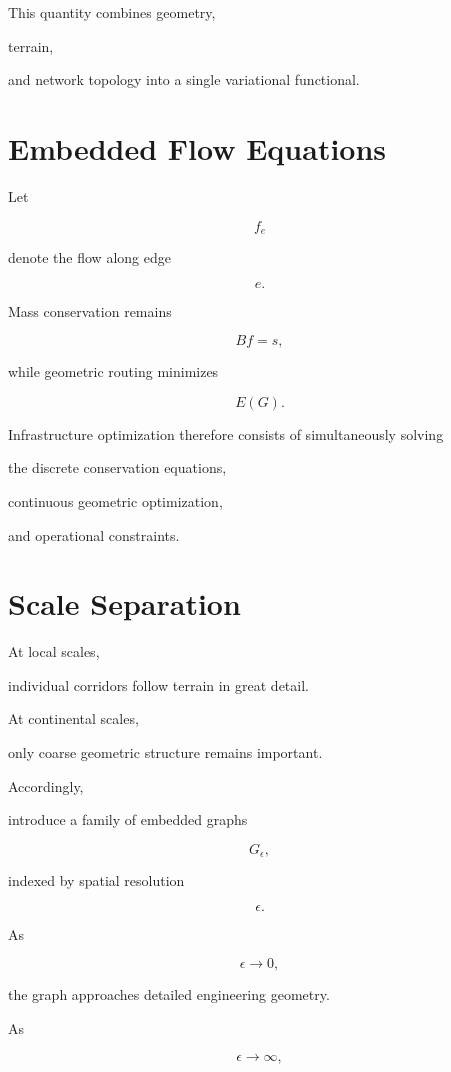 \documentclass[11pt,fleqn]{book}
\numberwithin{equation}{chapter}
\theoremstyle{plain}
\theoremstyle{definition}
\theoremstyle{remark}
\begin{document}
This quantity combines geometry,

terrain,

and network topology into a single variational functional.


\section{Embedded Flow Equations}

Let

\[
f_e
\]

denote the flow along edge

\[
e.
\]

Mass conservation remains

\[
Bf=s,
\]

while geometric routing minimizes

\[
E(G).
\]

Infrastructure optimization therefore consists of simultaneously solving

the discrete conservation equations,

continuous geometric optimization,

and operational constraints.


\section{Scale Separation}

At local scales,

individual corridors follow terrain in great detail.

At continental scales,

only coarse geometric structure remains important.

Accordingly,

introduce a family of embedded graphs

\[
G_\epsilon,
\]

indexed by spatial resolution

\[
\epsilon.
\]

As

\[
\epsilon
\rightarrow0,
\]

the graph approaches detailed engineering geometry.

As

\[
\epsilon
\rightarrow\infty,
\]
\end{document}
